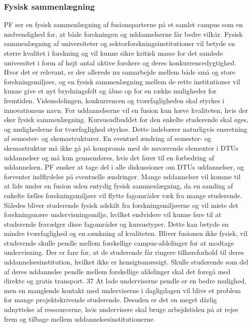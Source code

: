 \subsubsection{Fysisk sammenlægning}
PF ser en fysisk sammenlægning af fusionsparterne på et samlet campus som en nødvendighed for, at både forskningen
og uddannelserne får bedre vilkår. Fysisk sammenlægning af universiteter og sektorforskningsinstitutioner vil betyde en
større kvalitet i forskning og vil kunne sikre kritisk masse for det samlede universitet i form af højt antal aktive forskere
og deres konkurrencedygtighed. Hvor det er relevant, er der allerede nu samarbejde mellem både små og store
forskningsmiljøer, og en fysisk sammenlægning mellem de rette institutioner vil kunne give et nyt brydningsfelt og
åbne op for en række muligheder for fremtiden. Vidensdelingen, konkurrencen og tværfagligheden skal styrkes i
innovationens navn.
For uddannelserne vil en fusion kun hæve kvaliteten, hvis der sker fysisk sammenlægning. Kursusudbuddet for den
enkelte studerende skal øges, og mulighederne for tværfaglighed styrkes. Dette indebærer naturligvis ensretning af
semester- og skemastrukturer. En eventuel ændring af semester- og skemastruktur må ikke gå på kompromis med de
nuværende elementer i DTUs uddannelser og må kun gennemføres, hvis det fører til en forbedring af uddannelsen. PF
ønsker at tage del i alle diskussioner om DTUs uddannelser, og forventer indflydelse på eventuelle ændringer.
Mange uddannelser vil komme til at lide under en fusion uden entydig fysisk sammenlægning, da en samling af enkelte
fælles forskningsmiljøer vil flytte fagområder væk fra mange studerende. Således bliver studerende fysisk adskilt fra
forskningsmiljøerne og vil miste det forskningsnære undervisningsmiljø, hvilket endvidere vil kunne føre til at
studerende fravælger disse fagområder og kursustyper. Dette kan betyde en mindre tværfaglighed og en sænkning af
kvaliteten.
Bliver fusionen ikke fysisk, vil studerende skulle pendle mellem forskellige campus-afdelinger for at modtage
undervisning. Der er fare for, at de studerende får ringere tilhørsforhold til deres uddannelsesinstitution, hvilket ikke er
hensigtsmæssigt. Skulle studerende som del af deres uddannelse pendle mellem forskellige afdelinger skal det foregå
med direkte og gratis transport.
37
At lade underviserne pendle er en bedre mulighed, men en manglende kontakt med underviserne i dagligdagen vil blive
et problem for mange projektskrivende studerende. Desuden er det en meget dårlig udnyttelse af ressourcerne, hvis
undervisere skal bruge arbejdstiden på at rejse frem og tilbage mellem uddannelsesinstitutionerne.
